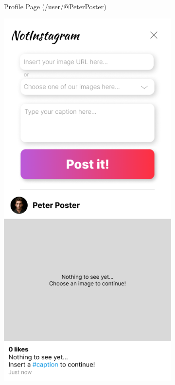 \documentclass[a4paper, 10pt]{article}
\begin{document}
\begin{figure}[ht!]
\begin{subfigure}{0.49\linewidth}
\begin{center}
    \end{center}
    \caption{Profile Page (/user/@PeterPoster)}\label{subfig:user}
  \end{subfigure}
  \begin{subfigure}{0.49\linewidth}
    \begin{center}
      \includegraphics[width=\linewidth, height=0.3\textheight, keepaspectratio]{img/ig-clone/Beitrag erstellen.png}

\end{center}
\end{subfigure}
\end{figure}
\end{document}
